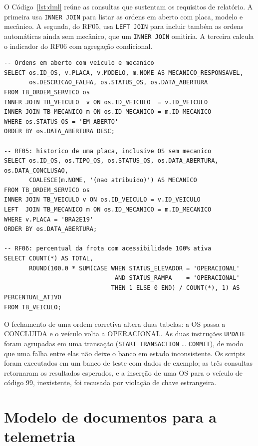\documentclass[12pt,a4paper,oneside]{report}
\newcommand{\fonte}[1]{\par\vspace{2pt}{\small Fonte: #1}\par}
\begin{document}
O Código~\ref{lst:dml} reúne as consultas que sustentam os requisitos de relatório. A primeira usa
\texttt{INNER JOIN} para listar as ordens em aberto com placa, modelo e mecânico. A segunda, do RF05, usa
\texttt{LEFT JOIN} para incluir também as ordens automáticas ainda sem mecânico, que um \texttt{INNER
JOIN} omitiria. A terceira calcula o indicador do RF06 com agregação condicional.

\begin{lstlisting}[language=SQLm,caption={Consultas com junções e indicador de frota},label=lst:dml]
-- Ordens em aberto com veiculo e mecanico
SELECT os.ID_OS, v.PLACA, v.MODELO, m.NOME AS MECANICO_RESPONSAVEL,
       os.DESCRICAO_FALHA, os.STATUS_OS, os.DATA_ABERTURA
FROM TB_ORDEM_SERVICO os
INNER JOIN TB_VEICULO  v ON os.ID_VEICULO  = v.ID_VEICULO
INNER JOIN TB_MECANICO m ON os.ID_MECANICO = m.ID_MECANICO
WHERE os.STATUS_OS = 'EM_ABERTO'
ORDER BY os.DATA_ABERTURA DESC;

-- RF05: historico de uma placa, inclusive OS sem mecanico
SELECT os.ID_OS, os.TIPO_OS, os.STATUS_OS, os.DATA_ABERTURA, os.DATA_CONCLUSAO,
       COALESCE(m.NOME, '(nao atribuido)') AS MECANICO
FROM TB_ORDEM_SERVICO os
INNER JOIN TB_VEICULO v ON os.ID_VEICULO = v.ID_VEICULO
LEFT  JOIN TB_MECANICO m ON os.ID_MECANICO = m.ID_MECANICO
WHERE v.PLACA = 'BRA2E19'
ORDER BY os.DATA_ABERTURA;

-- RF06: percentual da frota com acessibilidade 100% ativa
SELECT COUNT(*) AS TOTAL,
       ROUND(100.0 * SUM(CASE WHEN STATUS_ELEVADOR = 'OPERACIONAL'
                               AND STATUS_RAMPA    = 'OPERACIONAL'
                              THEN 1 ELSE 0 END) / COUNT(*), 1) AS PERCENTUAL_ATIVO
FROM TB_VEICULO;
\end{lstlisting}
\fonte{Elaborado pelo autor (2026).}

O fechamento de uma ordem corretiva altera duas tabelas: a OS passa a CONCLUIDA e o veículo volta a
OPERACIONAL. As duas instruções \texttt{UPDATE} foram agrupadas em uma transação
(\texttt{START TRANSACTION} \ldots{} \texttt{COMMIT}), de modo que uma falha entre elas não deixe o banco
em estado inconsistente. Os scripts foram executados em um banco de teste com dados de exemplo; as três
consultas retornaram os resultados esperados, e a inserção de uma OS para o veículo de código 99,
inexistente, foi recusada por violação de chave estrangeira.

\section{Modelo de documentos para a telemetria}
\end{document}

